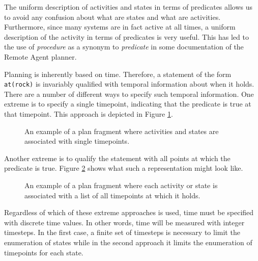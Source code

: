 The uniform description of activities and states in terms of
predicates allows us to avoid any confusion about what are states and
what are activities.  Furthermore, since many systems are in fact
active at all times, a uniform description of the activity in terms of
predicates is very useful.  This has led to the use of {\em procedure}
as a synonym to {\em predicate} in some documentation of the Remote 
Agent planner.




Planning is inherently based on time.  Therefore, a statement of the
form {\tt at(rock)} is invariably qualified with temporal information
about when it holds.  There are a number of different ways to specify
such temporal information.  One extreme is to specify a single
timepoint, indicating that the predicate is true at that timepoint.  
This approach is depicted in Figure \ref{singleTimepointPic}.


\begin{figure}[btph]
\centerline{
}
\caption{\label{singleTimepointPic} An example of a plan fragment where activities and 
states are associated with single timepoints.}
\end{figure}

Another extreme is to qualify the statement with all points at which 
the predicate is true.  Figure \ref{allTimepointPic} shows what such a 
representation might look like.


\begin{figure}[btph]
\centerline{
}
\caption{\label{allTimepointPic} An example of a plan fragment where each activity or
state is associated with a list of all timepoints at which it holds.}

\end{figure}
Regardless of which of these extreme approaches is used, time must be
specified with discrete time values.  In other words, time will be
measured with integer timesteps.  In the first case, a finite set of
timesteps is necessary to limit the enumeration of states while in the
second approach it limits the enumeration of timepoints for each
state.

